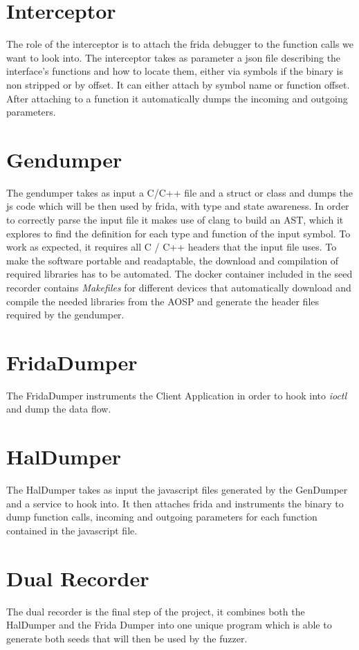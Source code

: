 \documentclass[a4paper,11pt,oneside]{report}
\begin{document}
\section{Interceptor}
The role of the interceptor is to attach the frida debugger to the function calls we want to look into.
The interceptor takes as parameter a json file describing
the interface's functions and how to locate them, either via symbols if the binary is non stripped or by offset.
It can either attach by symbol name or function offset.
After attaching to a function it automatically dumps the incoming and outgoing parameters.
\label{sec:Gendumper}
\section{Gendumper}
The gendumper takes as input a C/C++ file and a struct or class and dumps the js code which will be then used by frida, with type and state awareness. In order to correctly parse the input file it makes use of clang to build an
AST, which it explores to find the definition for each type and function of the input symbol. To work as
expected, it requires all C / C++ headers that the input file uses. To make the software portable and readaptable, the download and compilation of required libraries has to be automated. The docker container included in the seed recorder contains \emph{Makefiles} for different devices that automatically download and compile the needed libraries from the AOSP and generate the header files required by the gendumper.
\section{FridaDumper}
The FridaDumper instruments the Client Application in order to hook into \emph{ioctl} and dump the data flow.
\section{HalDumper}
The HalDumper takes as input the javascript files generated by the GenDumper and a service to hook into.
It then attaches frida and instruments the binary to
dump function calls, incoming and outgoing parameters for each function contained in the javascript file.
\section{Dual Recorder}
The dual recorder is the final step of the project, it combines both the HalDumper and the Frida Dumper into one unique program which is able to generate both seeds that will then be used by the fuzzer.
\end{document}
